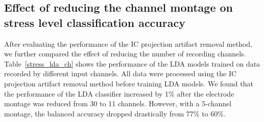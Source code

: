 \documentclass[journal]{IEEEtran}
\newcommand{\mc}[1]{\textcolor{red}{#1}}
\begin{document}

\subsection{Effect of reducing the channel montage on stress level classification accuracy}
After evaluating the performance of the IC projection artifact removal method, we further compared the effect of reducing the number of recording channels.
Table~\ref{stress_lda_ch} shows the performance of the LDA models trained on data recorded by different input channels.
All data were processed using the IC projection artifact removal method before training LDA models.
We found that the performance of the LDA classifier increased by 1\% after the electrode montage was reduced from 30 to 11 channels.
However, with a 5-channel montage, the balanced accuracy dropped drastically from 77\% to 60\%.
\end{document}
